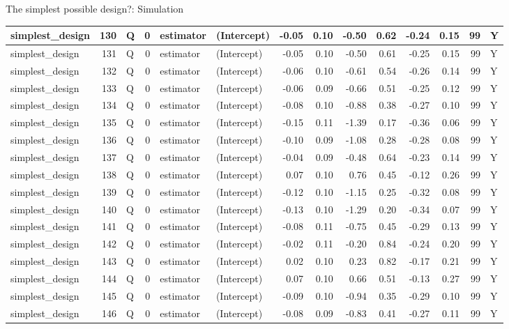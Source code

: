 \documentclass[
  11pt,
  ignorenonframetext,
]{beamer}
\begin{document}
\begin{frame}[fragile]{The simplest possible design?: Simulation}
\begin{tabular}{l|r|l|r|l|l|r|r|r|r|r|r|r|l}
\hline
simplest\_design & 130 & Q & 0 & estimator & (Intercept) & -0.05 & 0.10 & -0.50 & 0.62 & -0.24 & 0.15 & 99 & Y\\
\hline
simplest\_design & 131 & Q & 0 & estimator & (Intercept) & -0.05 & 0.10 & -0.50 & 0.61 & -0.25 & 0.15 & 99 & Y\\
\hline
simplest\_design & 132 & Q & 0 & estimator & (Intercept) & -0.06 & 0.10 & -0.61 & 0.54 & -0.26 & 0.14 & 99 & Y\\
\hline
simplest\_design & 133 & Q & 0 & estimator & (Intercept) & -0.06 & 0.09 & -0.66 & 0.51 & -0.25 & 0.12 & 99 & Y\\
\hline
simplest\_design & 134 & Q & 0 & estimator & (Intercept) & -0.08 & 0.10 & -0.88 & 0.38 & -0.27 & 0.10 & 99 & Y\\
\hline
simplest\_design & 135 & Q & 0 & estimator & (Intercept) & -0.15 & 0.11 & -1.39 & 0.17 & -0.36 & 0.06 & 99 & Y\\
\hline
simplest\_design & 136 & Q & 0 & estimator & (Intercept) & -0.10 & 0.09 & -1.08 & 0.28 & -0.28 & 0.08 & 99 & Y\\
\hline
simplest\_design & 137 & Q & 0 & estimator & (Intercept) & -0.04 & 0.09 & -0.48 & 0.64 & -0.23 & 0.14 & 99 & Y\\
\hline
simplest\_design & 138 & Q & 0 & estimator & (Intercept) & 0.07 & 0.10 & 0.76 & 0.45 & -0.12 & 0.26 & 99 & Y\\
\hline
simplest\_design & 139 & Q & 0 & estimator & (Intercept) & -0.12 & 0.10 & -1.15 & 0.25 & -0.32 & 0.08 & 99 & Y\\
\hline
simplest\_design & 140 & Q & 0 & estimator & (Intercept) & -0.13 & 0.10 & -1.29 & 0.20 & -0.34 & 0.07 & 99 & Y\\
\hline
simplest\_design & 141 & Q & 0 & estimator & (Intercept) & -0.08 & 0.11 & -0.75 & 0.45 & -0.29 & 0.13 & 99 & Y\\
\hline
simplest\_design & 142 & Q & 0 & estimator & (Intercept) & -0.02 & 0.11 & -0.20 & 0.84 & -0.24 & 0.20 & 99 & Y\\
\hline
simplest\_design & 143 & Q & 0 & estimator & (Intercept) & 0.02 & 0.10 & 0.23 & 0.82 & -0.17 & 0.21 & 99 & Y\\
\hline
simplest\_design & 144 & Q & 0 & estimator & (Intercept) & 0.07 & 0.10 & 0.66 & 0.51 & -0.13 & 0.27 & 99 & Y\\
\hline
simplest\_design & 145 & Q & 0 & estimator & (Intercept) & -0.09 & 0.10 & -0.94 & 0.35 & -0.29 & 0.10 & 99 & Y\\
\hline
simplest\_design & 146 & Q & 0 & estimator & (Intercept) & -0.08 & 0.09 & -0.83 & 0.41 & -0.27 & 0.11 & 99 & Y\\

\end{tabular}
\end{frame}
\end{document}

